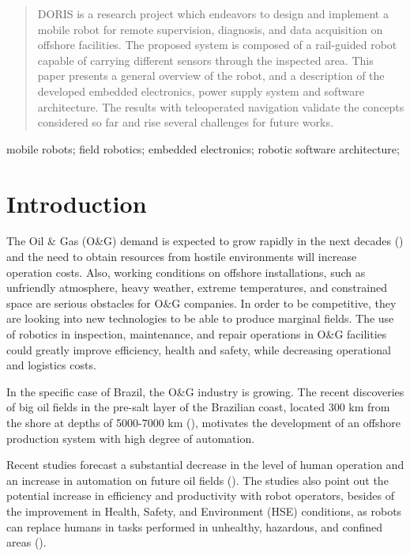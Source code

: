 \documentclass{ifacconf}
\begin{document}
\begin{frontmatter}
\begin{abstract}                %
DORIS is a research project which endeavors to design and implement a mobile
robot for remote supervision, diagnosis, and data acquisition on offshore
facilities. The proposed system is composed of a rail-guided robot capable of
carrying different sensors through the inspected area. This paper presents a
general overview of the robot, and a description of the developed embedded
electronics, power supply system and software architecture. The results
with teleoperated navigation validate the concepts considered so far and
rise several challenges for future works.
\end{abstract}

\begin{keyword}
mobile robots; field robotics; embedded electronics; robotic
software architecture;
\end{keyword}

\end{frontmatter}

\section{Introduction}
The Oil \& Gas (O\&G) demand is expected to grow rapidly in the next decades
(\cite{wna}) and the need to obtain resources from hostile environments will increase
operation costs. Also, working conditions on offshore installations, such as
unfriendly atmosphere, heavy weather, extreme temperatures, and constrained
space are serious obstacles for O\&G companies. In order to be competitive, they
are looking into new technologies to be able to produce marginal fields. The
use of robotics in inspection, maintenance, and repair operations in O\&G
facilities could greatly improve efficiency, health and safety, while
decreasing operational and logistics costs.

In the specific case of Brazil, the O\&G industry is growing. The
recent discoveries of big oil fields in the pre-salt layer of the Brazilian
coast, located 300 km from the shore at depths of 5000-7000 km (\cite{presal}),
motivates the development of an offshore production system with high degree of
automation.

Recent studies forecast a substantial decrease in the level of human operation
and an increase in automation on future oil fields
(\cite{skourup2009robotized}). The studies also point out the potential increase
in efficiency and productivity with robot operators, besides of the improvement
in Health, Safety, and Environment (HSE) conditions, as robots can replace
humans in tasks performed in unhealthy, hazardous, and confined areas (\cite{pal}).
\end{document}
